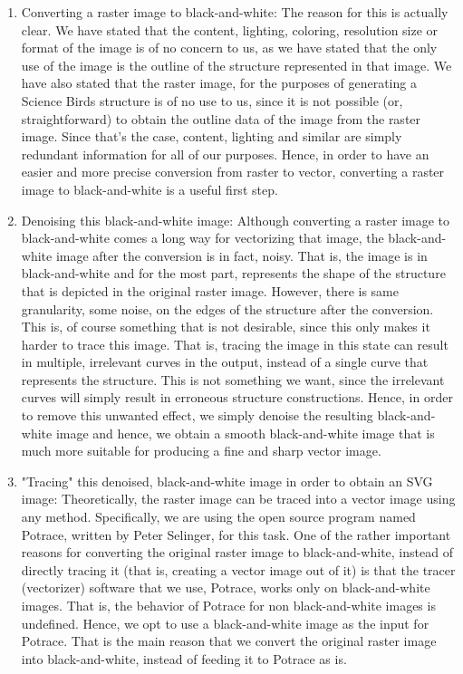 \documentclass[12pt]{dalthesis}
\begin{document}
\begin{enumerate}
  \item Converting a raster image to black-and-white: The reason for this is actually clear. We have stated that the content, lighting, coloring, resolution size or format of the image is of no concern to us, as we have stated that the only use of the image is the outline of the structure represented in that image. We have also stated that the raster image, for the purposes of generating a Science Birds structure is of no use to us, since it is not possible (or, straightforward) to obtain the outline data of the image from the raster image. Since that's the case, content, lighting and similar are simply redundant information for all of our purposes. Hence, in order to have an easier and more precise conversion from raster to vector, converting a raster image to black-and-white is a useful first step.

  \item Denoising this black-and-white image: Although converting a raster image to black-and-white comes a long way for vectorizing that image, the black-and-white image after the conversion is in fact, noisy. That is, the image is in black-and-white and for the most part, represents the shape of the structure that is depicted in the original raster image. However, there is same granularity, some noise, on the edges of the structure after the conversion. This is, of course something that is not desirable, since this only makes it harder to trace this image. That is, tracing the image in this state can result in multiple, irrelevant curves in the output, instead of a single curve that represents the structure. This is not something we want, since the irrelevant curves will simply result in erroneous structure constructions. Hence, in order to remove this unwanted effect, we simply denoise the resulting black-and-white image and hence, we obtain a smooth black-and-white image that is much more suitable for producing a fine and sharp vector image.

  \item "Tracing" this denoised, black-and-white image in order to obtain an SVG image: Theoretically, the raster image can be traced into a vector image using any method. Specifically, we are using the open source program named Potrace, written by Peter Selinger, for this task.
  One of the rather important reasons for converting the original raster image to black-and-white, instead of directly tracing it (that is, creating a vector image out of it) is that the tracer (vectorizer) software that we use, Potrace, works only on black-and-white images. That is, the behavior of Potrace for non black-and-white images is undefined. Hence, we opt to use a black-and-white image as the input for Potrace. That is the main reason that we convert the original raster image into black-and-white, instead of feeding it to Potrace as is.


\end{enumerate}
\end{document}

